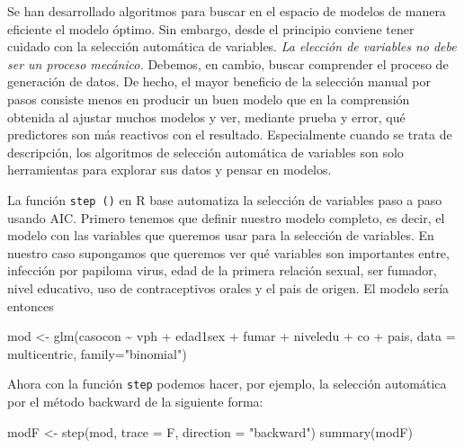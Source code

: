 \documentclass[
]{book}
\newenvironment{Shaded}{\begin{snugshade}}{\end{snugshade}}
\newcommand{\AttributeTok}[1]{\textcolor[rgb]{0.77,0.63,0.00}{#1}}
\newcommand{\FunctionTok}[1]{\textcolor[rgb]{0.00,0.00,0.00}{#1}}
\newcommand{\NormalTok}[1]{#1}
\newcommand{\OtherTok}[1]{\textcolor[rgb]{0.56,0.35,0.01}{#1}}
\newcommand{\SpecialCharTok}[1]{\textcolor[rgb]{0.00,0.00,0.00}{#1}}
\newcommand{\StringTok}[1]{\textcolor[rgb]{0.31,0.60,0.02}{#1}}
\begin{document}
Se han desarrollado algoritmos para buscar en el espacio de modelos de manera eficiente el modelo óptimo. Sin embargo, desde el principio conviene tener cuidado con la selección automática de variables. \emph{La elección de variables no debe ser un proceso mecánico.} Debemos, en cambio, buscar comprender el proceso de generación de datos. De hecho, el mayor beneficio de la selección manual por pasos consiste menos en producir un buen modelo que en la comprensión obtenida al ajustar muchos modelos y ver, mediante prueba y error, qué predictores son más reactivos con el resultado. Especialmente cuando se trata de descripción, los algoritmos de selección automática de variables son solo herramientas para explorar sus datos y pensar en modelos.

La función \texttt{step\ ()} en R base automatiza la selección de variables paso a paso usando AIC. Primero tenemos que definir nuestro modelo completo, es decir, el modelo con las variables que queremos usar para la selección de variables. En nuestro caso supongamos que queremos ver qué variables son importantes entre, infección por papiloma virus, edad de la primera relación sexual, ser fumador, nivel educativo, uso de contraceptivos orales y el pais de origen. El modelo sería entonces

\begin{Shaded}
\begin{Highlighting}[]
\NormalTok{mod }\OtherTok{\textless{}{-}} \FunctionTok{glm}\NormalTok{(casocon }\SpecialCharTok{\textasciitilde{}}\NormalTok{ vph }\SpecialCharTok{+}\NormalTok{ edad1sex }\SpecialCharTok{+}\NormalTok{ fumar }\SpecialCharTok{+}\NormalTok{ niveledu }\SpecialCharTok{+}\NormalTok{ co }\SpecialCharTok{+}\NormalTok{ pais, }
           \AttributeTok{data =}\NormalTok{ multicentric, }\AttributeTok{family=}\StringTok{"binomial"}\NormalTok{)}
\end{Highlighting}
\end{Shaded}

Ahora con la función \texttt{step} podemos hacer, por ejemplo, la selección automática por el método backward de la siguiente forma:

\begin{Shaded}
\begin{Highlighting}[]
\NormalTok{modF }\OtherTok{\textless{}{-}} \FunctionTok{step}\NormalTok{(mod, }\AttributeTok{trace =}\NormalTok{ F, }\AttributeTok{direction =} \StringTok{"backward"}\NormalTok{)}
\FunctionTok{summary}\NormalTok{(modF)}
\end{Highlighting}
\end{Shaded}
\end{document}
